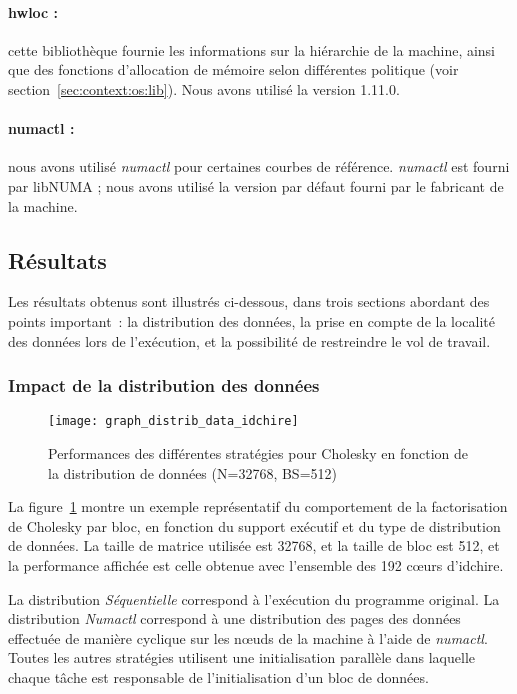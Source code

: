 \paragraph{hwloc :} cette bibliothèque fournie les informations sur la hiérarchie de la machine, ainsi que des fonctions d'allocation de mémoire selon différentes politique (voir section~\ref{sec:context:os:lib}). Nous avons utilisé la version 1.11.0.

\paragraph{numactl :} nous avons utilisé \emph{numactl} pour certaines courbes de référence. \emph{numactl} est fourni par libNUMA ; nous avons utilisé la version par défaut fourni par le fabricant de la machine.


\subsection{Résultats}\label{sec:contribs:perf_eval:resultats}

Les résultats obtenus sont illustrés ci-dessous, dans trois sections abordant des points important~: la distribution des données, la prise en compte de la localité des données lors de l'exécution, et la possibilité de restreindre le vol de travail.

\subsubsection{Impact de la distribution des données}

\begin{figure}[ht]
  \centering
  \texttt{[image: graph\_distrib\_data\_idchire]}
  \caption{Performances des différentes stratégies pour Cholesky en fonction de la distribution de données (N=32768, BS=512)}\label{fig:contribs:perf_eval:distrib-idchire}
\end{figure}


La figure~\ref{fig:contribs:perf_eval:distrib-idchire} montre un exemple représentatif du comportement de la factorisation de Cholesky par bloc, en fonction du support exécutif et du type de distribution de données. La taille de matrice utilisée est 32768, et la taille de bloc est 512, et la performance affichée est celle obtenue avec l'ensemble des 192 cœurs d'idchire.

La distribution \emph{Séquentielle} correspond à l'exécution du programme original.
La distribution \emph{Numactl} correspond à une distribution des pages des données effectuée de manière cyclique sur les nœuds de la machine à l'aide de \emph{numactl}.
Toutes les autres stratégies utilisent une initialisation parallèle dans laquelle chaque tâche est responsable de l'initialisation d'un bloc de données.

